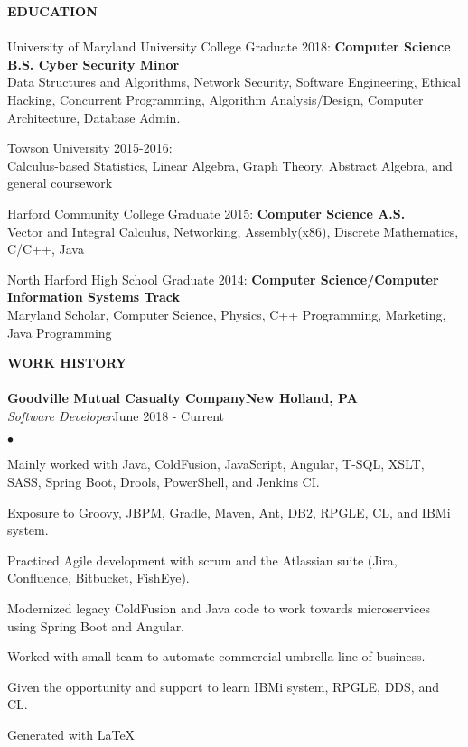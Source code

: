 \documentclass{article}
\newcommand{\lineunder}{
	\vspace*{-4pt}\\ 
	\hspace*{-18pt}\hrulefill \\
}
\newcommand{\header}[1]{
	{\hspace*{-15pt}\vspace*{6pt}\textsc{#1}}\vspace*{-6pt}\lineunder
}
\newcommand{\employer}[5]{
	{\textbf{#1}{\hfill\textbf{#2}}\\ 
	{{\emph{#3}}}\hfill {#4}\\ \hfill {#5}}
}
\newcommand{\education}[3]{
	{#1} \textbf{#2}\\
	{\hspace*{12pt}#3 }\\ 
	\vspace*{5pt}
}
\newenvironment{resumecontent}{
	\begin{list}
		{\small$\bullet$}{\topsep 0pt \itemsep -2pt}}{\vspace*{4pt}
	\end{list}
}
\newcommand{\resumeheader}[1]{
	\vspace*{5pt}
	\header{\textbf{#1}}
}
\begin{document}
	\resumeheader{EDUCATION}
		\education
			{University of Maryland University College Graduate 2018:} 
			{Computer Science B.S. Cyber Security Minor}
			{Data Structures and Algorithms, Network Security, Software Engineering, Ethical Hacking, Concurrent
			\hspace*{12pt}Programming, Algorithm Analysis/Design, Computer Architecture, Database Admin.}
		\education
			{Towson University 2015-2016:} 
			{}
			{Calculus-based Statistics, Linear Algebra, Graph Theory, Abstract Algebra, and general coursework}
		\education
			{Harford Community College Graduate 2015:}
			{Computer Science A.S.}
			{Vector and Integral Calculus, Networking, Assembly(x86), Discrete Mathematics, C/C++, Java}
		\education
			{North Harford High School Graduate 2014:} 
			{Computer Science/Computer Information Systems Track}
			{Maryland Scholar, Computer Science, Physics, C++ Programming, Marketing, Java Programming}

	\resumeheader{WORK HISTORY}
		\employer{Goodville Mutual Casualty Company}{New Holland, PA}{Software Developer} {June 2018 - Current} {}
			\vspace*{-8pt}
			\begin{resumecontent}
				\item Mainly worked with Java, ColdFusion, JavaScript, Angular, T-SQL, XSLT, SASS, Spring Boot, Drools, PowerShell, and Jenkins CI.
				\item Exposure to Groovy, JBPM, Gradle, Maven, Ant, DB2, RPGLE, CL, and IBMi system.
				\item Practiced Agile development with scrum and the Atlassian suite (Jira, Confluence, Bitbucket, FishEye).
				\item Modernized legacy ColdFusion and Java code to work towards microservices using Spring Boot and Angular.
				\item Worked with small team to automate commercial umbrella line of business.
				\item Given the opportunity and support to learn IBMi system, RPGLE, DDS, and CL.
			\end{resumecontent}

	\begin{center}
		\small 
		\vspace*{18pt} Generated with \LaTeX
	\end{center}
\end{document}
